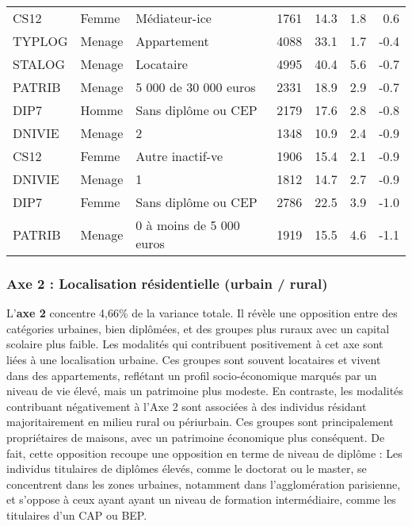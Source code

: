 \documentclass[
  12pt,
]{book}
\begin{document}
\begin{longtable}[t]{lllrrrr}
CS12 & Femme & Médiateur-ice & 1761 & 14.3 & 1.8 & 0.6\\
\addlinespace
TYPLOG & Menage & Appartement & 4088 & 33.1 & 1.7 & -0.4\\
STALOG & Menage & Locataire & 4995 & 40.4 & 5.6 & -0.7\\
PATRIB & Menage & 5 000 de 30 000 euros & 2331 & 18.9 & 2.9 & -0.7\\
DIP7 & Homme & Sans diplôme ou CEP & 2179 & 17.6 & 2.8 & -0.8\\
DNIVIE & Menage & 2 & 1348 & 10.9 & 2.4 & -0.9\\
\addlinespace
CS12 & Femme & Autre inactif-ve & 1906 & 15.4 & 2.1 & -0.9\\
DNIVIE & Menage & 1 & 1812 & 14.7 & 2.7 & -0.9\\
DIP7 & Femme & Sans diplôme ou CEP & 2786 & 22.5 & 3.9 & -1.0\\
PATRIB & Menage & 0 à moins de 5 000 euros & 1919 & 15.5 & 4.6 & -1.1\\*
\end{longtable}
\endgroup{}

\subsubsection{Axe 2 : Localisation résidentielle (urbain /
rural)}\label{axe-2-localisation-ruxe9sidentielle-urbain-rural}

L'\textbf{axe 2} concentre 4,66\% de la variance totale. Il révèle une
opposition entre des catégories urbaines, bien diplômées, et des groupes
plus ruraux avec un capital scolaire plus faible. Les modalités qui
contribuent positivement à cet axe sont liées à une localisation
urbaine. Ces groupes sont souvent locataires et vivent dans des
appartements, reflétant un profil socio-économique marqués par un niveau
de vie élevé, mais un patrimoine plus modeste. En contraste, les
modalités contribuant négativement à l'Axe 2 sont associées à des
individus résidant majoritairement en milieu rural ou périurbain. Ces
groupes sont principalement propriétaires de maisons, avec un patrimoine
économique plus conséquent. De fait, cette opposition recoupe une
opposition en terme de niveau de diplôme : Les individus titulaires de
diplômes élevés, comme le doctorat ou le master, se concentrent dans les
zones urbaines, notamment dans l'agglomération parisienne, et s'oppose à
ceux ayant ayant un niveau de formation intermédiaire, comme les
titulaires d'un CAP ou BEP.

\begingroup\fontsize{7}{9}\selectfont
\end{document}
